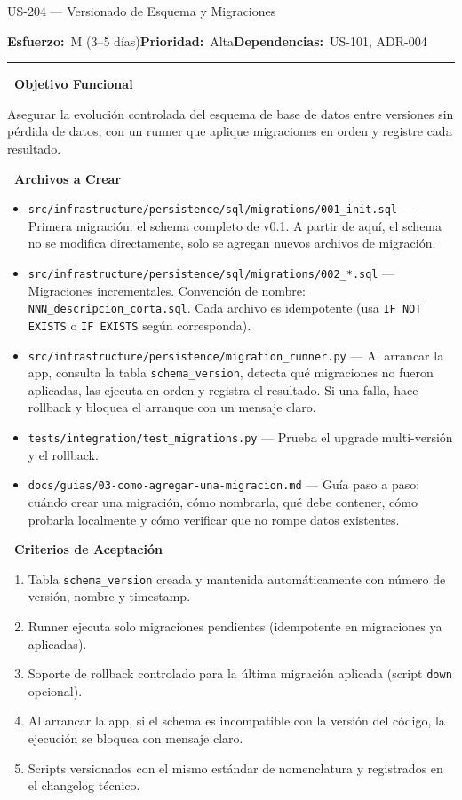 \documentclass[11pt,a4paper]{article}
\newcommand{\fpath}[1]{\texttt{\small #1}}
\newcommand{\usfield}[2][\;]{%
  \par\vspace{5pt}%
  {\small\textbf{\textcolor{primary}{#2}}}\par\vspace{2pt}%
}
\newcommand{\usmeta}[3]{%
  \vspace{2pt}%
  {\small\textcolor{secondary}{%
    \textbf{Esfuerzo:}~#1\quad\textbf{Prioridad:}~#2\quad\textbf{Dependencias:}~#3%
  }}%
  \par\vspace{4pt}%
  \textcolor{bordergray}{\rule{\linewidth}{0.4pt}}\par\vspace{4pt}%
}
\begin{document}
\begin{uscard}{US-204 — Versionado de Esquema y Migraciones}

\usmeta{M (3–5 días)}{Alta}{US-101, ADR-004}

\usfield{\faAlignLeft\ Objetivo Funcional}
Asegurar la evolución controlada del esquema de base de datos entre versiones sin pérdida de datos, con un runner que aplique migraciones en orden y registre cada resultado.

\usfield{\faFolderOpen\ Archivos a Crear}
\begin{itemize}[nosep, leftmargin=1.6em]
  \item \fpath{src/infrastructure/persistence/sql/migrations/001\_init.sql} — Primera migración: el schema completo de v0.1. A partir de aquí, el schema no se modifica directamente, solo se agregan nuevos archivos de migración.
  \item \fpath{src/infrastructure/persistence/sql/migrations/002\_*.sql} — Migraciones incrementales. Convención de nombre: \fpath{NNN\_descripcion\_corta.sql}. Cada archivo es idempotente (usa \fpath{IF NOT EXISTS} o \fpath{IF EXISTS} según corresponda).
  \item \fpath{src/infrastructure/persistence/migration\_runner.py} — Al arrancar la app, consulta la tabla \fpath{schema\_version}, detecta qué migraciones no fueron aplicadas, las ejecuta en orden y registra el resultado. Si una falla, hace rollback y bloquea el arranque con un mensaje claro.
  \item \fpath{tests/integration/test\_migrations.py} — Prueba el upgrade multi-versión y el rollback.
  \item \fpath{docs/guias/03-como-agregar-una-migracion.md} — Guía paso a paso: cuándo crear una migración, cómo nombrarla, qué debe contener, cómo probarla localmente y cómo verificar que no rompe datos existentes.
\end{itemize}

\usfield{\faCheckCircle\ Criterios de Aceptación}
\begin{enumerate}[label=\textcolor{accent}{\textbf{AC\arabic*.}}, nosep, leftmargin=2.2em]
  \item Tabla \fpath{schema\_version} creada y mantenida automáticamente con número de versión, nombre y timestamp.
  \item Runner ejecuta solo migraciones pendientes (idempotente en migraciones ya aplicadas).
  \item Soporte de rollback controlado para la última migración aplicada (script \fpath{down} opcional).
  \item Al arrancar la app, si el schema es incompatible con la versión del código, la ejecución se bloquea con mensaje claro.
  \item Scripts versionados con el mismo estándar de nomenclatura y registrados en el changelog técnico.
\end{enumerate}


\end{uscard}
\end{document}
